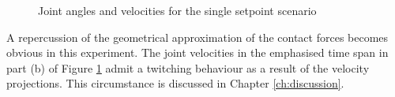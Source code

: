\begin{figure}[H]
    \centering
    


    \caption{Joint angles and velocities for the single setpoint scenario}
    \label{fig:case2-1-plot}
\end{figure}

A repercussion of the geometrical approximation of the contact forces becomes obvious in this experiment. The joint velocities in the emphasised time span in part (b) of Figure \ref{fig:case2-1-plot} admit a twitching behaviour as a result of the velocity projections. This circumstance is discussed in Chapter \ref{ch:discussion}.

